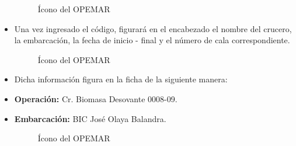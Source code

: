 \documentclass[a4paper,oneside,11pt]{book}
\begin{document}
\begin{itemize}
\begin{figure}[!h]
 \begin{center} 
 \caption{Ícono del OPEMAR}
\end{center}
 \end{figure}

\newpage
\item Una vez ingresado el código, figurará en el encabezado el nombre del crucero, la embarcación, la fecha de inicio - final y el número de cala correspondiente.

\begin{figure}[!h]
 \begin{center} 
 \caption{Ícono del OPEMAR}
\end{center}
 \end{figure}

\item Dicha información figura en la ficha de la siguiente manera:
\item [] {\textbf{Operación:}} Cr. Biomasa Desovante 0008-09.
\item [] {\textbf{Embarcación:}} BIC José Olaya Balandra.



\begin{figure}[!h]
 \begin{center} 
 \caption{Ícono del OPEMAR}
\end{center}
 \end{figure}





\end{itemize}
\end{document}
